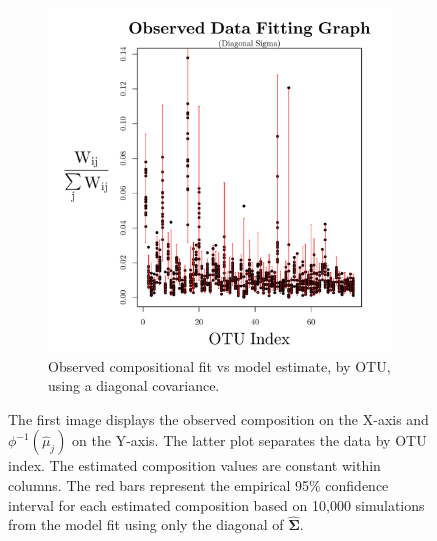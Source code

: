\documentclass{template}
\begin{document}
\begin{figure}[ht!]
\begin{subfigure}[b]{0.38\textheight}
        \includegraphics[width=\textwidth]{Images/XiaPlotBars11diagT.pdf}
        \caption{Observed compositional fit vs model estimate, by OTU, using a diagonal covariance.}
    \end{subfigure}
    \caption{The first image displays the observed composition on the X-axis and $\phi^{-1}(\hat{\mu}_j)$ on the Y-axis. The latter plot separates the data by OTU index. The estimated composition values are constant within columns. The red bars represent the empirical 95\% confidence interval for each estimated composition based on 10,000 simulations from the model fit using only the diagonal of $\hat{\boldsymbol{\Sigma}}$.}\label{fig:compFitBarDiag}
\end{figure}

\clearpage 
\end{document}
